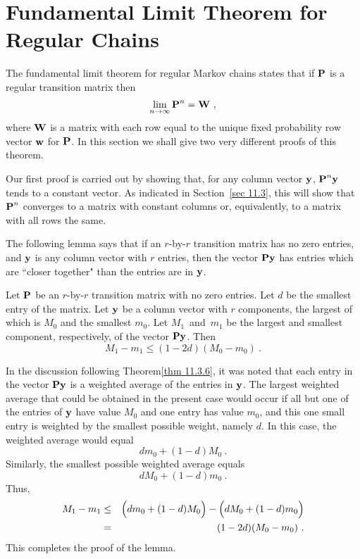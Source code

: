 \section[Fundamental Limit Theorem]{Fundamental Limit Theorem for Regular
\newline Chains}\label{sec 11.4}

The fundamental limit theorem for regular Markov chains states that if
${\mbox{\bf P}\/}$ is
a regular transition matrix then
$$
\lim_{n \to \infty} {\mbox{\bf P}\/}^n = {\mbox{\bf W}\/}\ ,
$$
where ${\mbox{\bf W}\/}$ is a matrix with each row equal to the unique fixed probability
row vector
${\mbox{\bf w}\/}$ for ${\mbox{\bf P}\/}$.  In this section we shall give two very different
proofs of this
theorem.
\par
Our first proof is carried out by showing that, for any column vector
${\mbox{\bf y}\/}$,
${\mbox{\bf P}\/}^n {\mbox{\bf y}\/}$ tends to a constant vector.  As indicated in
Section~\ref{sec 11.3}, this
will show that ${\mbox{\bf P}\/}^n$ converges to a matrix with constant columns or,
equivalently, to a
matrix with all rows the same.
\par
The following lemma says that if an $r$-by-$r$ transition matrix has no zero
entries, 
and ${\mbox{\bf y}\/}$ is any column vector with $r$ entries, then the vector ${\mbox{\bf P}\/}{\mbox{\bf y}\/}$ has
entries which are ``closer together" than the entries are in ${\mbox{\bf y}\/}$.

\begin{lemma}
Let ${\mbox{\bf P}\/}$ be an $r$-by-$r$ transition matrix with no zero entries.  Let $d$
be
the smallest entry of the matrix.  Let ${\mbox{\bf y}\/}$ be a column vector with $r$
components, the largest of which is $M_0$ and the smallest $m_0$.  Let
$M_1$~and~$m_1$ be the largest and smallest component, respectively, of the
vector ${\mbox{\bf P}\/} {\mbox{\bf y}\/}$.  Then
$$
M_1 - m_1 \leq (1 - 2d)(M_0 - m_0)\ .
$$

\proof
In the discussion following Theorem\ref{thm 11.3.6}, it was noted that each
entry in the vector
${\mbox{\bf P}\/}{\mbox{\bf y}\/}$ is a weighted average of the entries in ${\mbox{\bf y}\/}$.  The
largest weighted
average that could be obtained in the present case would occur if all but one
of the entries of
${\mbox{\bf y}\/}$ have  value $M_0$ and one entry has value $m_0$, and this one small
entry is weighted 
by the smallest possible weight,  namely $d$.  In this case, the weighted
average
would equal
$$dm_0 + (1-d)M_0\ .$$
Similarly, the smallest possible weighted average equals
$$dM_0 + (1-d)m_0\ .$$
Thus,
\begin{eqnarray*}
M_1 - m_1 &\le& \Bigl(dm_0 + (1-d)M_0\Bigr) - \Bigl(dM_0 + (1-d)m_0\Bigr) \\
          &=& (1 - 2d)(M_0 - m_0)\ .
\end{eqnarray*}
This completes the proof of the lemma.
\end{lemma}

